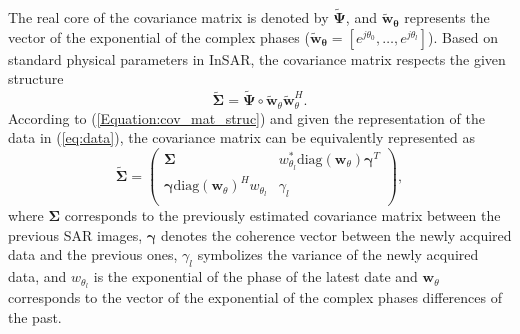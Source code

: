     The real core of the covariance matrix is denoted by $\mathbf{\widetilde{\Psi}}$, and $\mathbf{\widetilde{w}}_{\mathbf{\theta}}$ represents the vector of the exponential of the complex phases ($\mathbf{\widetilde{w}}_{\mathbf{\theta}}=[e^{j \theta_0}, \dots,e^{j \theta_{l}}]$). Based on standard physical parameters in \acs{InSAR}, the covariance matrix respects the given structure \citep{guarnieri2008exploitation}
    \vspace{-0.4em}
    \begin{equation}
        \label{Equation:cov_mat_struc}
       \mathbf{\widetilde{\Sigma}} = \mathbf{\widetilde{\Psi}} \circ \mathbf{\widetilde{w}}_{\theta}\mathbf{\widetilde{w}}_{\theta}^H.
    \end{equation}
    According to (\ref{Equation:cov_mat_struc}) and given the representation of the data in (\ref{eq:data}), the covariance matrix can be equivalently represented as 
    \begin{equation}
        \label{cov_mat_struc_block}
        \mathbf{\widetilde{\Sigma}} = \left( 
            \begin{array}{cc}
               \boldsymbol{\Sigma} &   w_{\theta_{l}}^* \mathrm{diag}(\mathbf{w}_{\theta})\boldsymbol{\gamma}^T  \\
                \boldsymbol{\gamma} \mathrm{diag}(\mathbf{w}_{\theta})^H w_{\theta_{l}}    & \gamma_{l} \\ 
            \end{array} \right),
    \end{equation}
    where $\mathbf{\Sigma}$ corresponds to the previously estimated covariance matrix between the previous \acs{SAR} images, $\boldsymbol{\gamma}$ denotes the coherence vector between the newly acquired data and the previous ones, $\gamma_{l}$ symbolizes the variance of the newly acquired data,  and $w_{\theta_{l}}$ is the exponential of the phase of the latest date %
    and $ \mathbf{w}_{\theta}$ corresponds to the vector of the exponential of the complex phases differences of the past. %
